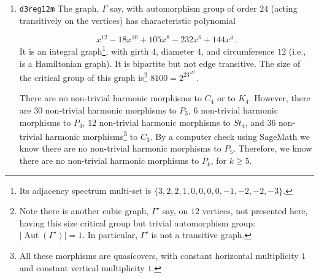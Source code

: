 \documentclass[12pt,letterpaper]{article}
\theoremstyle{definition}
\DeclareMathOperator{\Aut}{Aut}
\begin{document}
\begin{enumerate}
\[
x^{12} - 18x^{10} - 8x^9 + 117x^8 + 96x^7 - 316x^6 - 384x^5 + 240x^4 + 512x^3 + 192x^2 \, .
\]
This graph has chromatic number $3$ and is not edge transitive.
It has girth $3$, diameter $3$, and
is a Hamiltonian graph (with circumference $12$).
The size of the critical group of this graph is $6000=2^43\cdot 5^3$.

This graph has $12$ non-trivial harmonic morphisms to $P_3$,
$6$ non-trivial harmonic morphisms to $C_3$,
$6$ non-trivial harmonic morphisms to $P_4$,
$24$ non-trivial harmonic morphisms\footnote{All 24 of
  these non-trivial harmonic morphisms of $\Gamma_2\to\Gamma_1=K_4$
  are covers of degree $3$
  and are permuted amongst each other by the automorphism group.}
to $K_4$, but
no non-trivial harmonic morphisms to $C_4$ or to $St_4$.
All the non-trivial harmonic morphisms to $K_4$ are covers
and they are permuted transitively under the action of the
automorphism group of the graph.

SageMath notation:

\verb@graphs.LCFGraph(12, [6, -2, 2], 4)@


\item
  {\tt d3reg12m}\newline %
The graph, $\Gamma$ say, with automorphism group of order $24$
(acting transitively on the vertices) has characteristic polynomial  

\[
x^{12} - 18x^{10} + 105x^8 - 232x^6 + 144x^4  \, .
\]
It is an integral graph\footnote{Its adjacency spectrum
multi-set  is $\{3, 2, 2, 1, 0, 0, 0, 0, -1, -2, -2, -3\}$.},
with girth $4$, diameter $4$, and
circumference $12$ (i.e., is a Hamiltonian graph). 
It is bipartite but not edge transitive.
The size of the critical group of this graph
is\footnote{Note there is another
cubic graph, $\Gamma'$ say, on $12$ vertices, not presented here,
having this size critical group but trivial automorphism group:
$|\Aut(\Gamma')|=1$. In particular, $\Gamma'$ is not a transitive graph.}
$8100=2^23^45^2$.

There are no non-trivial harmonic morphisms to $C_4$ or to $K_4$.
However, there are $30$ non-trivial harmonic morphisms to $P_3$,
$6$ non-trivial harmonic morphisms to $P_4$,
$12$ non-trivial harmonic morphisms to $St_4$, and
$36$ non-trivial harmonic morphisms\footnote{All these
  morphisms are quasicovers, with constant horizontal multiplicity
  $1$ and constant vertical multiplicity $1$.} to $C_3$.
By a computer check using SageMath we know there
are no non-trivial harmonic morphisms to $P_5$.
Therefore, we know there
are no non-trivial harmonic morphisms to $P_k$, for $k\geq 5$.


\end{enumerate}
\end{document}
